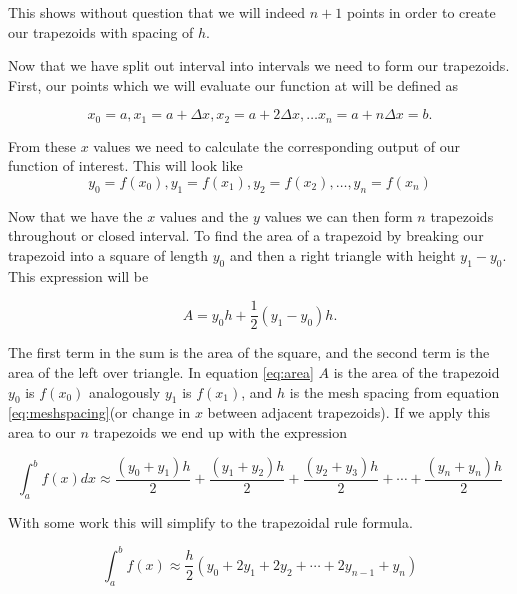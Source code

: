 \documentclass[10pt, reqno]{article}
\numberwithin{equation}{section}
\numberwithin{figure}{section}
\begin{document}
\noindent This shows without question that we will indeed $n+1$ points in order to create our trapezoids with spacing of $h$. 

Now that we have split out interval into intervals we need to form our trapezoids. First, our points which we will evaluate our function at will be defined as 

$$ 
x_0 = a, x_1 = a + \Delta x, x_2 = a + 2\Delta x, \dots x_n = a + n\Delta x = b. 
$$

From these $x$ values we need to calculate the corresponding output of our function of interest. This will look like 
$$
y_0 = f(x_0), y_1 = f(x_1), y_2 = f(x_2), \dots, y_n = f(x_n) 
$$ 

Now that we have the $x$ values and the $y$ values we can then form $n$ trapezoids throughout or closed interval. To find the area of a trapezoid by breaking our trapezoid into a square of length $y_0$ and then a right triangle with height $y_1 - y_0$. This expression will be 

\begin{equation}
\label{eq:area}
A = y_0 h + \frac{1}{2}(y_1 - y_0)h.
\end{equation}

The first term in the sum is the area of the square, and the second term is the area of the left over triangle. In equation \ref{eq:area} $A$ is the area of the trapezoid $y_0$ is $f(x_0)$ analogously $y_1$ is $f(x_1)$, and $h$ is the mesh spacing from equation \ref{eq:meshspacing}(or change in $x$ between adjacent trapezoids). 
If we apply this area to our $n$ trapezoids we end up with the expression 

\begin{equation}
\int_{a}^{b} f(x)dx \approx \frac{(y_0 + y_1)h}{2} + \frac{(y_1 + y_2)h}{2} + \frac{(y_2 + y_3)h}{2} + \cdots + \frac{(y_n + y_n)h}{2}
\end{equation}

\noindent With some work this will simplify to the trapezoidal rule formula. 

\begin{equation}
\int_{a}^{b} f(x) \approx \frac{h}{2}(y_0 + 2y_1 + 2y_2 + \cdots + 2y_{n-1} + y_n)
\end{equation}
 
\theoremstyle{definition}
\newtheorem{exmp}{Example}[section]
\end{document}
